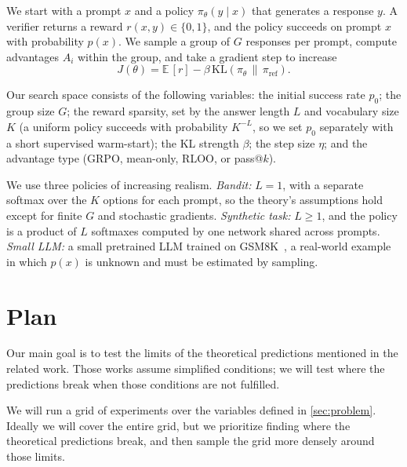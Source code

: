 \documentclass{article}
\theoremstyle{definition}
\newcommand{\E}{\mathbb{E}}
\newcommand{\1}{\mathbf{1}}
\newcommand{\KL}{\mathrm{KL}}
\newcommand{\piref}{\pi_{\mathrm{ref}}}
\begin{document}
We start with a prompt $x$ and a policy $\pi_\theta(y \mid x)$ that generates
a response $y$. A verifier returns a reward $r(x, y) \in \{0, 1\}$, and the
policy succeeds on prompt $x$ with probability $p(x)$. We sample a group of
$G$ responses per prompt, compute advantages $A_i$ within the group, and take
a gradient step to increase
\begin{equation}
  \label{eq:objective}
  J(\theta) = \E\,[r] - \beta\, \KL(\pi_\theta \,\|\, \piref).
\end{equation}

Our search space consists of the following variables: the initial success
rate $p_0$; the group size $G$; the reward sparsity, set by the answer length
$L$ and vocabulary size $K$ (a uniform policy succeeds with probability
$K^{-L}$, so we set $p_0$ separately with a short supervised warm-start);
the KL strength $\beta$; the step size $\eta$; and the advantage type (GRPO,
mean-only, RLOO, or pass@$k$).

We use three policies of increasing realism. \emph{Bandit:} $L = 1$, with a
separate softmax over the $K$ options for each prompt, so the theory's
assumptions hold except for finite $G$ and stochastic gradients.
\emph{Synthetic task:} $L \ge 1$, and the policy is a product of $L$
softmaxes computed by one network shared across prompts.
\emph{Small LLM:} a small pretrained LLM trained on
GSM8K~\citep{cobbe2021gsm8k}, a real-world example in which $p(x)$ is
unknown and must be estimated by sampling.

\section{Plan}
\label{sec:experiments}

Our main goal is to test the limits of the theoretical predictions mentioned
in the related work. Those works assume simplified conditions; we will test
where the predictions break when those conditions are not fulfilled.

We will run a grid of experiments over the variables defined in
\cref{sec:problem}. Ideally we will cover the entire grid, but we prioritize
finding where the theoretical predictions break, and then sample the grid
more densely around those limits.
\end{document}
